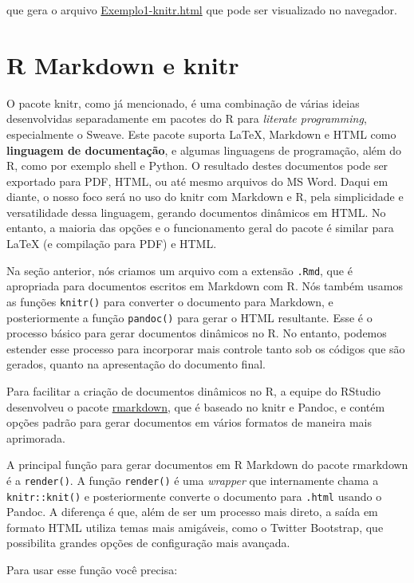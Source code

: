 \documentclass[10pt,a4paper]{book}
\begin{document}
que gera o arquivo
\href{exemplos/Exemplo1-knitr.html}{Exemplo1-knitr.html} que pode ser
visualizado no navegador.

\section{R Markdown e knitr}\label{r-markdown-e-knitr}

O pacote knitr, como já mencionado, é uma combinação de várias ideias
desenvolvidas separadamente em pacotes do R para \emph{literate
programming}, especialmente o Sweave. Este pacote suporta LaTeX,
Markdown e HTML como \textbf{linguagem de documentação}, e algumas
linguagens de programação, além do R, como por exemplo shell e Python. O
resultado destes documentos pode ser exportado para PDF, HTML, ou até
mesmo arquivos do MS Word. Daqui em diante, o nosso foco será no uso do
knitr com Markdown e R, pela simplicidade e versatilidade dessa
linguagem, gerando documentos dinâmicos em HTML. No entanto, a maioria
das opções e o funcionamento geral do pacote é similar para LaTeX (e
compilação para PDF) e HTML.

Na seção anterior, nós criamos um arquivo com a extensão \texttt{.Rmd},
que é apropriada para documentos escritos em Markdown com R. Nós também
usamos as funções \texttt{knitr()} para converter o documento para
Markdown, e posteriormente a função \texttt{pandoc()} para gerar o HTML
resultante. Esse é o processo básico para gerar documentos dinâmicos no
R. No entanto, podemos estender esse processo para incorporar mais
controle tanto sob os códigos que são gerados, quanto na apresentação do
documento final.

Para facilitar a criação de documentos dinâmicos no R, a equipe do
RStudio desenvolveu o pacote
\href{http://rmarkdown.rstudio.com}{rmarkdown}, que é baseado no knitr e
Pandoc, e contém opções padrão para gerar documentos em vários formatos
de maneira mais aprimorada.

A principal função para gerar documentos em R Markdown do pacote
rmarkdown é a \texttt{render()}. A função \texttt{render()} é uma
\emph{wrapper} que internamente chama a \texttt{knitr::knit()} e
posteriormente converte o documento para \texttt{.html} usando o Pandoc.
A diferença é que, além de ser um processo mais direto, a saída em
formato HTML utiliza temas mais amigáveis, como o Twitter Bootstrap, que
possibilita grandes opções de configuração mais avançada.

Para usar esse função você precisa:
\end{document}
